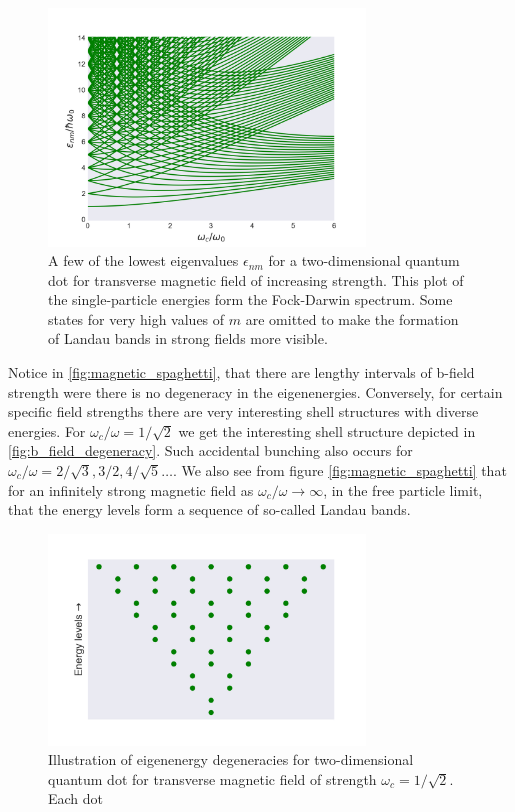 \begin{figure}
    \centering
    \includegraphics[width=0.75\textwidth]{implementation/figures/spaghetti.png}
    \caption{A few of the lowest eigenvalues $\epsilon_{nm}$ for a two-dimensional 
    quantum dot for transverse magnetic field of increasing strength. This plot of 
    the single-particle energies form the Fock-Darwin spectrum. Some states for very 
    high values of $m$ are omitted to make the formation of Landau bands in strong
    fields more visible.
    \label{fig:magnetic_spaghetti}}
\end{figure}

Notice in \autoref{fig:magnetic_spaghetti}, that there are lengthy intervals of 
b-field strength were there is no degeneracy in the eigenenergies. Conversely, 
for certain specific field strengths there are very interesting shell structures with 
diverse energies. For $\omega_c/\omega=1/\sqrt{2}$ we get the interesting shell structure
depicted in \autoref{fig:b_field_degeneracy}. Such accidental bunching also occurs 
for $\omega_c/\omega=2/\sqrt{3}, 3/2, 4/\sqrt{5}\dots$. We also see from figure 
\autoref{fig:magnetic_spaghetti} that for an infinitely strong magnetic field as 
$\omega_c/\omega \to \infty$, in the free particle limit, that the energy levels 
form a sequence of so-called Landau bands. 


\begin{figure}
    \centering
    \includegraphics[width=0.75\textwidth]{implementation/figures/omega_inv_square_root_2_degeneracy.png}
    \caption{Illustration of eigenenergy degeneracies for two-dimensional quantum 
    dot for transverse magnetic field of strength $\omega_c=1/\sqrt{2}$.
    Each dot 
    \label{fig:b_field_degeneracy}}
\end{figure}

